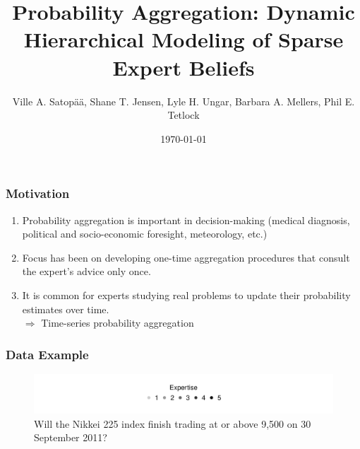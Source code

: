 \documentclass{beamer}
\title[Probability Aggregation]{Probability Aggregation: Dynamic Hierarchical Modeling of Sparse Expert Beliefs}
\author{Ville A. Satop\"a\"a,  Shane T. Jensen, Lyle H. Ungar, Barbara A. Mellers, Phil E. Tetlock}
\institute[University of  Pennsylvania]
{
University of Pennsylvania \\
\medskip
{\emph{satopaa@wharton.upenn.edu}}
}
\date{\today}
\begin{document}
%
\begin{frame}
\titlepage
\end{frame}
%


\begin{frame}
\frametitle{Motivation}
\begin{enumerate}
\item Probability aggregation is important in decision-making (medical diagnosis, political and socio-economic foresight, meteorology, etc.)
\item Focus has been on developing one-time aggregation procedures that consult the expert's advice only once.
\item It is common for experts studying real problems to update their probability estimates over time.\\
\vspace{1em}
 $\Rightarrow$ Time-series probability aggregation
\end{enumerate}
\end{frame}



\begin{frame}
\frametitle{Data Example}

\begin{figure}[h!]
\centering
\vspace{-1.5em}
	\includegraphics[width=  \textwidth]{LegendExamplePlot} %
\vspace{-1.5em}


\caption{Will the Nikkei 225 index finish trading at or above 9,500 on 30 September 2011?}
\label{ExamplePlots}
\end{figure}
\end{frame}
\end{document}
